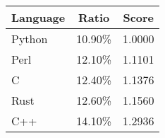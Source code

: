 \centering
\begin{tabular}{|l|c|c|}
    \hline
    Language & Ratio & Score \\
    \hline
    Python & 10.90\% & 1.0000 \\
    Perl & 12.10\% & 1.1101 \\
    C & 12.40\% & 1.1376 \\
    Rust & 12.60\% & 1.1560 \\
    C++ & 14.10\% & 1.2936 \\
    \hline
\end{tabular}
